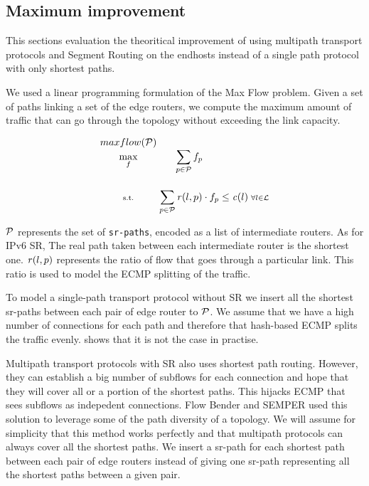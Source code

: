 
\subsection{Maximum improvement}

This sections evaluation the theoritical improvement of using
multipath transport protocols and Segment Routing on the endhosts
instead of a single path protocol with only shortest paths.

We used a linear programming formulation of the Max Flow problem.
Given a set of paths linking a set of the edge routers, we compute
the maximum amount of traffic that can go through the topology without
exceeding the link capacity.

\begin{equation*}
	\setlength\arraycolsep{0.2pt}
	\begin{smallmatrix}
		\displaystyle maxflow(\P) & & \\
		\displaystyle \max_{f} & \displaystyle \sum_{p \in \P} f_{p} & \\[0.5cm]
		\textrm{s.t.}          & \displaystyle \sum_{p \in \P} \r(l, p) \cdot f_{p} & \displaystyle \leq & \displaystyle \cap(l) & \forall l \in \L
	\end{smallmatrix}
\end{equation*}

$\P$ represents the set of \texttt{sr-paths}, encoded as a list of intermediate routers.
As for IPv6 SR, The real path taken between each intermediate router is the shortest one.
$\r(l, p)$ represents the ratio of flow that goes through a particular link.
This ratio is used to model the ECMP splitting of the traffic.

To model a single-path transport protocol without SR
we insert all the shortest sr-paths between each pair of edge router to $\P$.
We assume that we have a high number of connections for each path
and therefore that hash-based ECMP splits the traffic evenly.
\cite{ecmphashperf} shows that it is not the case in practise.

Multipath transport protocols with SR also uses shortest path routing.
However, they can establish a big number of subflows for each connection
and hope that they will cover all or a portion of the shortest paths.
This hijacks ECMP that sees subflows as indepedent connections.
Flow Bender and SEMPER used this solution to leverage
some of the path diversity of a topology.
We will assume for simplicity that this method works perfectly and that multipath protocols
can always cover all the shortest paths.
We insert a sr-path for each shortest path between each pair of edge routers
instead of giving one sr-path representing all the shortest paths between a given pair. 

